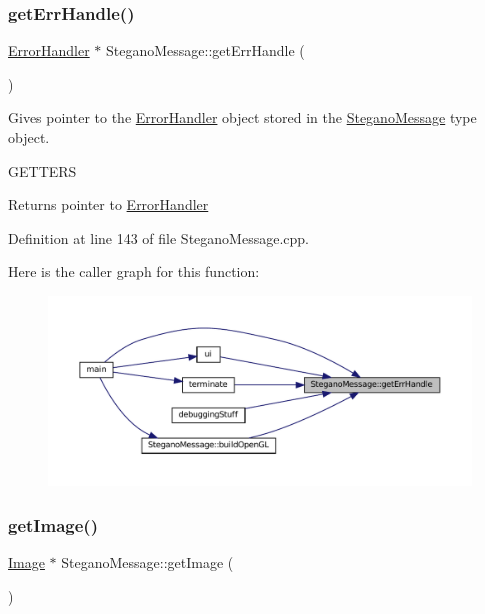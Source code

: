 \subsubsection{\texorpdfstring{getErrHandle()}{getErrHandle()}}
{\footnotesize\ttfamily \mbox{\hyperlink{classErrorHandler}{Error\+Handler}} $\ast$ Stegano\+Message\+::get\+Err\+Handle (\begin{DoxyParamCaption}{ }\end{DoxyParamCaption})}



Gives pointer to the \mbox{\hyperlink{classErrorHandler}{Error\+Handler}} object stored in the \mbox{\hyperlink{classSteganoMessage}{Stegano\+Message}} type object. 

G\+E\+T\+T\+E\+RS\begin{DoxyReturn}{Returns}
pointer to \mbox{\hyperlink{classErrorHandler}{Error\+Handler}} 
\end{DoxyReturn}


Definition at line 143 of file Stegano\+Message.\+cpp.

Here is the caller graph for this function\+:\nopagebreak
\begin{figure}[H]
\begin{center}
\leavevmode
\includegraphics[width=350pt]{classSteganoMessage_a0134757a8c79caa9dca9bcce0686d1ef_icgraph}
\end{center}
\end{figure}
\mbox{\label{classSteganoMessage_a2e3ad705a0219edfd2150f3f7931979c}} 
\subsubsection{\texorpdfstring{getImage()}{getImage()}}
{\footnotesize\ttfamily \mbox{\hyperlink{classImage}{Image}} $\ast$ Stegano\+Message\+::get\+Image (\begin{DoxyParamCaption}{ }\end{DoxyParamCaption})}



